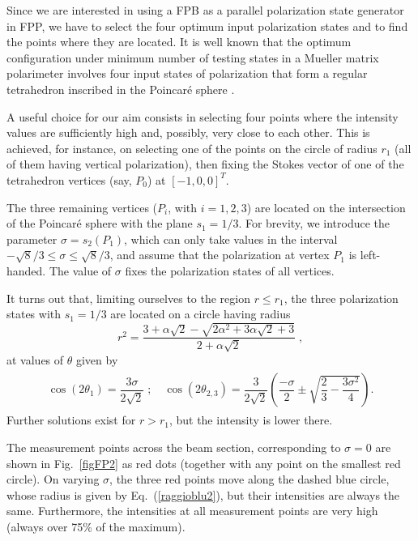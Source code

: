 \documentclass{article}
\begin{document}
Since we are interested in using a FPB as a parallel polarization state generator in FPP, we have to select the four optimum input polarization states and to find the points where they are located. 
It is well known that the optimum configuration under minimum number of testing states in a Mueller matrix polarimeter involves four input states of polarization that form a regular tetrahedron inscribed in the Poincar\'e sphere \cite{Azzam:JOSAA88,Layden:OE12,Twietmeyer:OE08}. 

A useful choice for our aim consists in selecting four points where the intensity values are sufficiently high and, possibly, very close to each other. This is achieved, for instance, on selecting one of the points on the circle of radius $r_1$ (all of them having vertical polarization), then fixing the Stokes vector of one of the tetrahedron vertices (say, $P_0$) at $[-1, 0, 0]^T$.

The three remaining vertices ($P_i$, with $i=1,2,3$) are located on the intersection of the Poincar\'e sphere with the plane $s_1=1/3$. 
For brevity, we introduce the parameter $\sigma=s_2(P_1)$, which can only take values in the interval $-\sqrt{8}/3 \le \sigma \le \sqrt{8}/3$, and assume that the polarization at vertex $P_1$ is left-handed. The value of $\sigma$ fixes the polarization states of all vertices.

It turns out that, limiting ourselves to the region $r \le r_1$, the three polarization states with $s_1=1/3$ are located on a circle having radius 
%
\begin{equation}
r^2=\dfrac{3+\alpha \sqrt{2}-\sqrt{2\alpha^2+3 \alpha \sqrt{2} +3}}{2+\alpha \sqrt{2}} \; ,
\label{raggioblu2}
\end{equation}
%
at values of $\theta$ given by
%
\begin{eqnarray}
\begin{array}{c}
 \cos\left(2 \theta_{1}\right)=\dfrac{3 \sigma}{2\sqrt{2}} \; ; \,\,\, \,\,\,
   \cos\left(2 \theta_{2,3}\right)=\dfrac{3}{2\sqrt{2}} \left(\dfrac{-\sigma}{2}\pm \sqrt{\dfrac{2}{3}-\dfrac{3 \sigma^2}{4}}\right) .  
\end{array}
\end{eqnarray}
%
Further solutions exist for $r>r_1$, but the intensity is lower there.

The measurement points across the beam section, corresponding to $\sigma=0$ are shown in Fig.~\ref{figFP2} as red dots (together with any point on the smallest red circle).
On varying $\sigma$, the three red points move along the dashed blue circle, whose radius is given by Eq.~(\ref{raggioblu2}), but their intensities are always the same. Furthermore, the intensities at all measurement points are very high (always over 75\% of the maximum).
\end{document}
